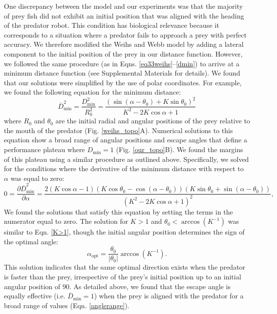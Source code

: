 \documentclass[12pt]{article}
\def\ds{\displaystyle}
\def\d{\partial}
\newcommand{\ol}{\overline}
\begin{document}
One discrepancy between the model and our experiments was that the majority of prey fish did not exhibit an initial position that was aligned with the heading of the predator robot. This condition has biological relevance because it corresponds to a situation where a predator fails to approach a prey with perfect accuracy. 
We therefore modified the Weihs and Webb model by adding a lateral component to the initial position of the prey in our distance function. 
However, we followed the same procedure (as in Eqns. \ref{eq33weihs}--\ref{dmin}) to arrive at a minimum distance function (see Supplemental Materials for details). We found that our solutions were simplified by the use of polar coordinates. For example, we found the following equation for the minimum distance:
%
\begin{equation}
\ol{D}^2_{\text{min}}= \ds\frac{{D}^2_{\text{min}}}{R_0^2 }=
\ds\frac{\left ( \sin(\alpha - \theta_0) + K \sin \theta_0 \right )^2}{K^2-2 K \cos \alpha +1} 
\label{Dmin_polar}
\end{equation}
%
where $R_0$ and $\theta_0$ are the initial radial and angular positions of the prey relative to the mouth of the predator (Fig. \ref{weihs_topo}A). Numerical solutions to this equation show a broad range of angular positions and escape angles that define a performance plateau where $D_{\text{min}}=1$ (Fig. \ref{our_topo}B). 
We found the margins of this plateau using a similar procedure as outlined above. Specifically, we solved for the conditions where the derivative of the minimum distance with respect to $\alpha$ was equal to zero:
%
\begin{equation}
0 = \frac{\d \ol{D}^2_{\text{min}}}{\d \alpha} = 
\frac{2(K \cos \alpha - 1)(K\cos \theta_0 - \cos(\alpha - \theta_0))(K\sin \theta_0 + \sin(\alpha -\theta_0))}
{(K^2 - 2K \cos \alpha + 1)^2},
\label{DminDalpha}
\end{equation} 
%
We found the solutions that satisfy this equation by setting the terms in the numerator equal to zero. The solution for $K>1$ and $\theta_0 < \arccos(K^{-1})$ was similar to Eqn. \ref{K>1}, though the initial angular position determines the sign of the optimal angle: 
%
\begin{equation}
\alpha_{\text{opt}} = \frac{\theta_0}{|\theta_0|}  \arccos(K^{-1}).
\label{DminDalpha}
\end{equation} 
%
This solution indicates that the same optimal direction exists when the predator is faster than the prey, irrespective of the prey's initial position up to an initial angular position of 90\textdegree. As detailed above, we found that the escape angle is equally effective (i.e. $\ol D_{\text{min}}=1$) when the prey is aligned with the predator for a broad range of values (Eqn. \ref{anglerange}). 
\end{document}
